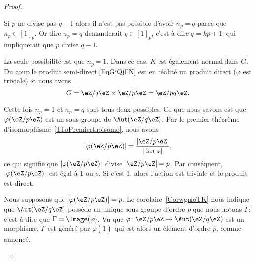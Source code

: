 \begin{proof}
\begin{subproof}

		Si \( p\) ne divise pas \( q-1\) alors il n'est pas possible d'avoir \( n_p=q\) parce que \( n_p\in [1]_p\). Or dire \( n_p=q\) demanderait \( q\in [1]_p\), c'est-à-dire \( q=kp+1\), qui impliquerait que \( p\) divise \( q-1\).

		La seule possibilité est que \( n_p=1\). Dans ce cas, \( K\) est également normal dans \( G\). Du coup le produit semi-direct \eqref{EqGjQjFN} est en réalité un produit direct (\( \varphi\) est triviale) et nous avons
		\begin{equation}
			G=\eZ/q\eZ\times \eZ/p\eZ=\eZ/pq\eZ.
		\end{equation}

		\spitem[Si \( p\) divise \( q-1\)]

		Cette fois \( n_p=1\) et \( n_p=q\) sont tous deux possibles. Ce que nous savons est que \( \varphi(\eZ/p\eZ)\) est un sous-groupe de \( \Aut(\eZ/q\eZ)\). Par le premier théorème d'isomorphisme~\ref{ThoPremierthoisomo}, nous avons
		\begin{equation}
			| \varphi(\eZ/p\eZ) |=\frac{ | \eZ/p\eZ | }{ | \ker\varphi | },
		\end{equation}
		ce qui signifie que \( | \varphi(\eZ/p\eZ) |\) divise \( | \eZ/p\eZ |=p\). Par conséquent, \( | \varphi(\eZ/p\eZ) |\) est égal à \( 1\) ou \( p\). Si c'est \( 1\), alors l'action est triviale et le produit est direct.

		Nous supposons que \( | \varphi(\eZ/p\eZ) |=p\). Le corolaire~\ref{CorwgmoTK} nous indique que \( \Aut(\eZ/q\eZ)\) possède un unique sous-groupe d'ordre \( p\) que nous notons \( \Gamma\); c'est-à-dire que \( \Gamma=\Image(\varphi)\). Vu que \( \varphi\colon \eZ/p\eZ\to \Aut(\eZ/q\eZ)\) est un morphisme, \( \Gamma\) est généré par \( \varphi(\bar 1)\) qui est alors un élément d'ordre \( p\), comme annoncé.


\end{subproof}
\end{proof}
